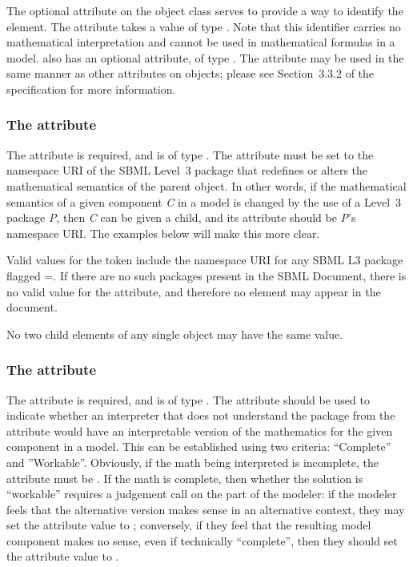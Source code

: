 The optional  attribute on the \MathChangedClaim object class serves to provide a way to identify the element.  The attribute takes a value of type .  Note that this identifier carries no mathematical interpretation and cannot be used in mathematical formulas in a model.  \MathChangedClaim also has an optional  attribute, of type .  The  attribute may be used in the same manner as other  attributes on \sbmlthreecore objects; please see Section~3.3.2 of the \sbmlthreecore specification for more information.


\subsubsection{The \fixttspace{} attribute}
\label{attribute-changedBy}

The  attribute is required, and is of type .  The attribute must be set to the namespace URI of the SBML Level~3 package that redefines or alters the mathematical semantics of the parent object.  In other words, if the mathematical semantics of a given component \emph{C} in a model is changed by the use of a Level~3 package \emph{P}, then \emph{C} can be given a \MathChangedClaim child, and its attribute  should be \emph{P}'s namespace URI.  The examples below will make this more clear.

Valid values for the  token include the namespace URI for any SBML L3 package flagged  =.  If there are no such packages present in the SBML Document, there is no valid value for the  attribute, and therefore no \MathChangedClaim element may appear in the document.

No two child \MathChangedClaim elements of any single \SBase object may have the same  value.  


\subsubsection{The \fixttspace{} attribute}
\label{attribute-absenceleavesalternative}

The  attribute is required, and is of type .  The attribute should be used to indicate whether an interpreter that does not understand the package from the  attribute would have an interpretable version of the mathematics for the given component in a model.  This can be established using two criteria:  ``Complete'' and ''Workable''.  Obviously, if the math being interpreted is incomplete, the  attribute must be .  If the math is complete, then whether the solution is ``workable'' requires a judgement call on the part of the modeler: if the modeler feels that the alternative version makes sense in an alternative context, they may set the attribute value to ; conversely, if they feel that the resulting model component makes no sense, even if technically ``complete'', then they should set the attribute value to .

